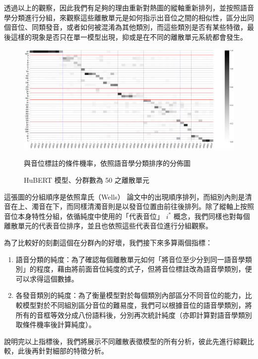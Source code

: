 {        透過以上的觀察，因此我們有足夠的理由重新對熱圖的縱軸重新排列，並按照語音學分類進行分組，來觀察這些離散單元是如何指示出音位之間的相似性，區分出同個音位、同類發音，或者如何被混淆為其他類別，而這些類別是否有某些特徵，最後這樣的現象是否只在單一模型出現，抑或是在不同的離散單元系統都會發生。

\begin{figure}
    \centering
    \includegraphics[width=1\linewidth]{figures/hubert-50-givenunit-byphn.png}
    \caption[]{%
        HuBERT 模型、分群數為 50 之離散單元}
                                                    與音位標註的條件機率，依照語音學分類排序的分佈圖
    \label{fig:hubert-50-givenunit-byphn}
\end{figure}

        這張圖的分組順序是依照韋氏（Wells） \cite{wells_phonetic_2022} 論文中的出現順序排列，而組別內則是清音在上、濁音在下，而同樣清濁音則是以發音位置由前往後排列。除了縱軸上按照音位本身特性分組，依循純度中使用的「代表音位」 $i^\ast$ 概念，我們同樣也對每個離散單元的代表音位排序，並且也依照這些代表音位進行分組觀察。

        為了比較好的刻劃這個在分群內的好壞，我們接下來多算兩個指標：\par
\begin{enumerate}
    \item 語音分類的純度：為了確認每個離散單元如何「將音位至少分到同一語音學類別」的程度，藉由將前面音位純度的式子，但將音位標註改為語音學類別，便可以求得這個數據。
    \item 各發音類別的純度：為了衡量模型對於每個類別內部區分不同音位的能力，比較模型對於不同組別區分音位的難易度，我們可以根據音位的語音學類別，將所有的音框等效分成八份語料後，分別再次統計純度（亦即計算對語音學類別取條件機率後計算純度）。
\end{enumerate}

        說明完以上指標後，我們將展示不同離散表徵模型的所有分析，彼此先進行綜觀比較，此後再針對細部的特徵分析。


}